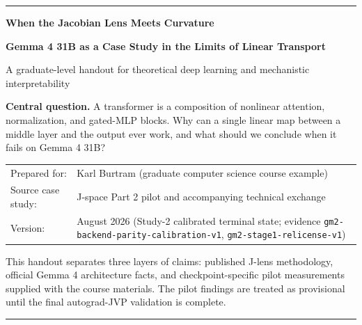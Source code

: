 \documentclass[11pt]{article}
\theoremstyle{definition}
\theoremstyle{remark}
\begin{document}

\begin{titlepage}
\thispagestyle{empty}
\vspace*{0.7in}

{\color{violetdark}\rule{\textwidth}{2.2pt}}
\vspace{0.35in}

{\Huge\bfseries\color{ink} When the Jacobian Lens Meets Curvature\par}
\vspace{0.16in}
{\LARGE\bfseries\color{violetdark} Gemma 4 31B as a Case Study in the Limits of Linear Transport\par}

\vspace{0.42in}
{\large A graduate-level handout for theoretical deep learning and mechanistic interpretability\par}

\vspace{0.55in}
\begin{tcolorbox}[enhanced,colback=lavender,colframe=violet,boxrule=1pt,arc=2mm,left=4mm,right=4mm,top=3mm,bottom=3mm]
\textbf{Central question.} A transformer is a composition of nonlinear attention, normalization, and gated-MLP blocks. Why can a single linear map between a middle layer and the output ever work, and what should we conclude when it fails on Gemma 4 31B?
\end{tcolorbox}

\vfill
\begin{tabular}{@{}ll@{}}
Prepared for: & Karl Burtram \quad (graduate computer science course example)\\
Source case study: & J-space Part 2 pilot and accompanying technical exchange\\
Version: & August 2026 (Study-2 calibrated terminal state; evidence \texttt{gm2-backend-parity-calibration-v1}, \texttt{gm2-stage1-relicense-v1})\\
\end{tabular}

\vspace{0.25in}
{\small\color{slate}
This handout separates three layers of claims: published J-lens methodology, official Gemma 4 architecture facts, and checkpoint-specific pilot measurements supplied with the course materials. The pilot findings are treated as provisional until the final autograd-JVP validation is complete.}

\vspace{0.25in}
{\color{violetdark}\rule{\textwidth}{2.2pt}}
\end{titlepage}
\end{document}
